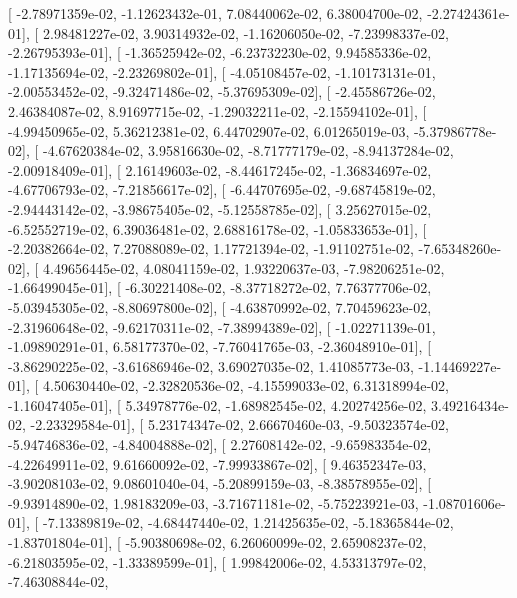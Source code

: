 \documentclass{article}
\begin{document}
       [ -2.78971359e-02,  -1.12623432e-01,   7.08440062e-02,
          6.38004700e-02,  -2.27424361e-01],
       [  2.98481227e-02,   3.90314932e-02,  -1.16206050e-02,
         -7.23998337e-02,  -2.26795393e-01],
       [ -1.36525942e-02,  -6.23732230e-02,   9.94585336e-02,
         -1.17135694e-02,  -2.23269802e-01],
       [ -4.05108457e-02,  -1.10173131e-01,  -2.00553452e-02,
         -9.32471486e-02,  -5.37695309e-02],
       [ -2.45586726e-02,   2.46384087e-02,   8.91697715e-02,
         -1.29032211e-02,  -2.15594102e-01],
       [ -4.99450965e-02,   5.36212381e-02,   6.44702907e-02,
          6.01265019e-03,  -5.37986778e-02],
       [ -4.67620384e-02,   3.95816630e-02,  -8.71777179e-02,
         -8.94137284e-02,  -2.00918409e-01],
       [  2.16149603e-02,  -8.44617245e-02,  -1.36834697e-02,
         -4.67706793e-02,  -7.21856617e-02],
       [ -6.44707695e-02,  -9.68745819e-02,  -2.94443142e-02,
         -3.98675405e-02,  -5.12558785e-02],
       [  3.25627015e-02,  -6.52552719e-02,   6.39036481e-02,
          2.68816178e-02,  -1.05833653e-01],
       [ -2.20382664e-02,   7.27088089e-02,   1.17721394e-02,
         -1.91102751e-02,  -7.65348260e-02],
       [  4.49656445e-02,   4.08041159e-02,   1.93220637e-03,
         -7.98206251e-02,  -1.66499045e-01],
       [ -6.30221408e-02,  -8.37718272e-02,   7.76377706e-02,
         -5.03945305e-02,  -8.80697800e-02],
       [ -4.63870992e-02,   7.70459623e-02,  -2.31960648e-02,
         -9.62170311e-02,  -7.38994389e-02],
       [ -1.02271139e-01,  -1.09890291e-01,   6.58177370e-02,
         -7.76041765e-03,  -2.36048910e-01],
       [ -3.86290225e-02,  -3.61686946e-02,   3.69027035e-02,
          1.41085773e-03,  -1.14469227e-01],
       [  4.50630440e-02,  -2.32820536e-02,  -4.15599033e-02,
          6.31318994e-02,  -1.16047405e-01],
       [  5.34978776e-02,  -1.68982545e-02,   4.20274256e-02,
          3.49216434e-02,  -2.23329584e-01],
       [  5.23174347e-02,   2.66670460e-03,  -9.50323574e-02,
         -5.94746836e-02,  -4.84004888e-02],
       [  2.27608142e-02,  -9.65983354e-02,  -4.22649911e-02,
          9.61660092e-02,  -7.99933867e-02],
       [  9.46352347e-03,  -3.90208103e-02,   9.08601040e-04,
         -5.20899159e-03,  -8.38578955e-02],
       [ -9.93914890e-02,   1.98183209e-03,  -3.71671181e-02,
         -5.75223921e-03,  -1.08701606e-01],
       [ -7.13389819e-02,  -4.68447440e-02,   1.21425635e-02,
         -5.18365844e-02,  -1.83701804e-01],
       [ -5.90380698e-02,   6.26060099e-02,   2.65908237e-02,
         -6.21803595e-02,  -1.33389599e-01],
       [  1.99842006e-02,   4.53313797e-02,  -7.46308844e-02,
\end{document}
